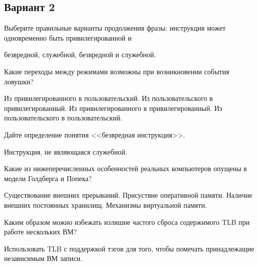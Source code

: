\subsection*{Вариант 2}

\begin{questions}

\question[3] Выберите правильные варианты продолжения фразы: инструкция может одновременно быть привилегированной и
\begin{choices}
\choice безвредной,
\correctchoice служебной,
\choice безвредной и служебной.
\end{choices}

\question[3] Какие переходы между режимами возможны при возникновении события ловушки?
\begin{choices}
\choice        Из привилегированного в пользовательский.
\correctchoice Из пользовательского в привилегированный.
\correctchoice Из привилегированного в привилегированный.
\choice        Из пользовательского в пользовательский.
\end{choices}

\question[3] Дайте определение понятия <<безвредная инструкция>>.
\begin{solution}[1cm]
Инструкция, не являющаяся служебной.
\end{solution}

\question[3] Какие из нижеперечисленных особенностей реальных компьютеров опущены в модели Голдберга и Попека?
\begin{choices}
    \correctchoice Существование внешних прерываний.
    \choice Присуствие оперативной памяти.
    \correctchoice Наличие внешних постоянных хранилищ.
    \choice Механизмы виртуальной памяти.
\end{choices}

\question[3] Каким образом можно избежать излишне частого сброса содержимого TLB при работе нескольких ВМ?
\begin{solution}[1cm]
Использовать TLB с поддержкой тэгов для того, чтобы помечать принадлежащие независимым ВМ записи.
\end{solution}

\end{questions}
